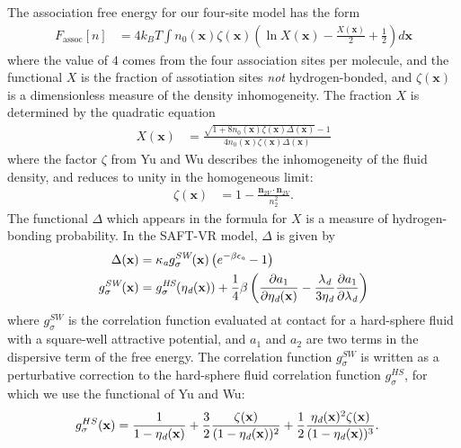 \documentclass[letterpaper,twocolumn,amsmath,amssymb,prb]{revtex4-1}
\newcommand{\xx}{\textbf{x}}
\begin{document}
The association free energy for our four-site model has the form
\begin{align}
  F_\text{assoc}[n] &= 4 k_BT \int n_0(\xx)\zeta(\xx)
  \left(\ln X(\xx) - \frac{X(\xx)}{2} + \frac12\right) d\xx
\end{align}
where the value of $4$ comes from the four association sites per
molecule, and the functional $X$ is the fraction of assotiation sites
\emph{not} hydrogen-bonded, and $\zeta(\xx)$ is a dimensionless
measure of the density inhomogeneity.  The fraction $X$ is determined
by the quadratic equation
\begin{align}
  X(\xx) &= \frac{\sqrt{1 + 8n_0(\xx)\zeta(\xx)\Delta(\xx)} - 1}
  {4 n_0(\xx)\zeta(\xx)\Delta(\xx)}
\end{align}
where the factor $\zeta$ from
Yu and Wu\cite{yu2002fmt-dft-inhomogeneous-associating,
  fu2005vapor-liquid-dft} describes the inhomogeneity of the fluid
density, and reduces to unity in the homogeneous limit:
\begin{align}
  \zeta(\xx) &= 1 - \frac{\mathbf{n}_{2V}\cdot\mathbf{n}_{2V}}{n_2^2}.
\end{align}
The functional $\Delta$ which appears in the formula for $X$ is a
measure of hydrogen-bonding probability.  In the SAFT-VR
model\cite{gil-villegas-1997-SAFT-VR}, $\Delta$ is given by
\begin{align}
  \Delta(\xx) &= \kappaassoc g^\textit{SW}_\sigma(\xx)
  \left(e^{-\beta\epsilonassoc} - 1\right) \\
  g^\textit{SW}_\sigma(\xx) &= g^\textit{HS}_\sigma(\etadisp(\xx)) +
  \frac{1}{4}\beta\left(\frac{\partial a_1}{\partial \etadisp(\xx)} -
  \frac{\lambdadisp}{3 \etadisp}\frac{\partial a_1}{\partial \lambdadisp}\right)
\end{align}
where $g^\textit{SW}_\sigma$ is the correlation function evaluated at
contact for a hard-sphere fluid with a square-well attractive
potential, and $a_1$ and $a_2$ are two terms in the dispersive term of
the free energy.  The correlation function $g^\textit{SW}_\sigma$ is
written as a perturbative correction to the hard-sphere fluid correlation
function $g^\textit{HS}_\sigma$, for which we use the functional of Yu and
Wu\cite{yu2002fmt-dft-inhomogeneous-associating}:
\begin{align}
  g_\sigma^{HS}(\xx) &= \frac{1}{1-\etadisp(\xx)}
  +\frac32\frac{\zeta(\xx)}{(1-\etadisp(\xx))^2}
  + \frac12\frac{\etadisp(\xx)^2\zeta(\xx)}{(1-\etadisp(\xx))^3}.
\end{align}
\end{document}
